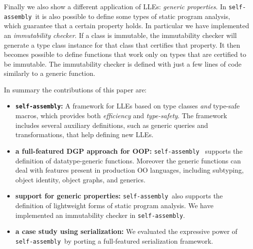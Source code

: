 \documentclass[preprint]{sigplanconf}
\newcommand{\selfassembly}{\texttt{self-assembly~}}
\newcommand{\sselfassembly}{\texttt{self-assembly}}
\begin{document}
Finally we also show a different application of LLEs: \emph{generic
  properties}. In \selfassembly it is also possible to define some
types of static program analysis, which guarantee that a certain
property holds. In particular we have implemented an
\emph{immutability checker}. If a class is immutable, the immutability
checker will generate a type class instance for that class that
certifies that property. It then becomes possible to
define functions that work only on types that are certified to be
immutable.  The immutability checker is defined with just a few lines
of code similarly to a generic function.

In summary the contributions of this paper are:

\begin{itemize}

\item {\bf \sselfassembly:} A framework for LLEs based on
  type classes \emph{and} type-safe macros, which provides both
  \emph{efficiency} and \emph{type-safety}. The framework includes
  several auxiliary definitions, such as generic queries and
  transformations, that help defining new LLEs.

\item {\bf a full-featured DGP approach for OOP:} \selfassembly
  supports the definition of datatype-generic functions.
  Moreover the generic functions can deal with features present in
  production OO languages, including subtyping, object identity,
  object graphs, and generics.

\item {\bf support for generic properties:} \selfassembly also
  supports the definition of lightweight forms of static program analysis.
  We have implemented an immutability checker in \sselfassembly.

\item {\bf a case study using serialization:} We evaluated the
  expressive power of \selfassembly by porting a full-featured
  serialization framework.




\end{itemize}
\end{document}
